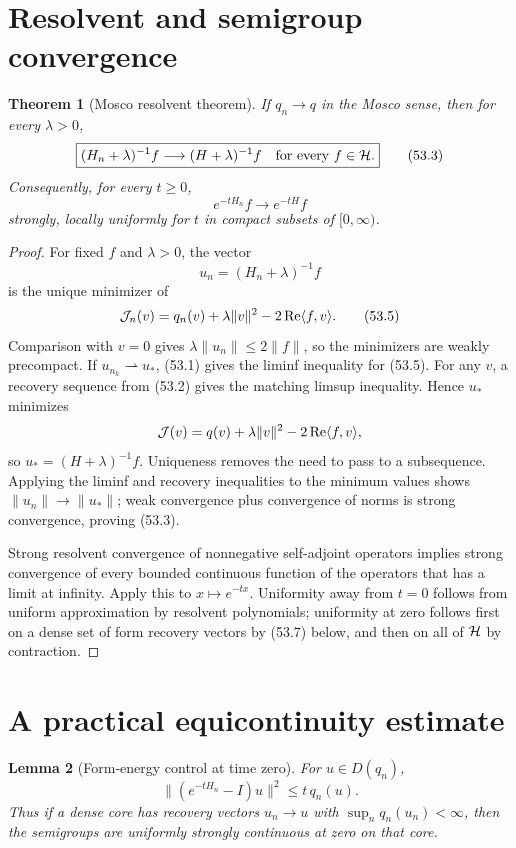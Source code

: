 \documentclass[11pt]{article}
\newtheorem{theorem}{Theorem}[section]
\newtheorem{lemma}[theorem]{Lemma}
\theoremstyle{remark}
\begin{document}
\section{Resolvent and semigroup convergence}

\begin{theorem}[Mosco resolvent theorem]
\label{thm:v15v53-mosco-resolvent}
If \(q_n\to q\) in the Mosco sense, then for every \(\lambda>0\),
\[
 \boxed{
 (H_n+\lambda)^{-1}f\longrightarrow(H+\lambda)^{-1}f
 \quad\text{for every }f\in{\cal H}.}                   \tag{53.3}
\]
Consequently, for every \(t\geq0\),
\[
 e^{-tH_n}f\longrightarrow e^{-tH}f                    \tag{53.4}
\]
strongly, locally uniformly for \(t\) in compact subsets of
\([0,\infty)\).
\end{theorem}

\begin{proof}
For fixed \(f\) and \(\lambda>0\), the vector
\[
 u_n=(H_n+\lambda)^{-1}f
\]
is the unique minimizer of
\[
 {\cal J}_n(v)=q_n(v)+\lambda\|v\|^2
 -2\operatorname{Re}\langle f,v\rangle.                 \tag{53.5}
\]
Comparison with \(v=0\) gives
\(\lambda\|u_n\|\leq2\|f\|\), so the minimizers are weakly
precompact.  If \(u_{n_k}\rightharpoonup u_*\), (53.1) gives the
liminf inequality for (53.5).  For any \(v\), a recovery sequence
from (53.2) gives the matching limsup inequality.  Hence \(u_*\)
minimizes
\[
 {\cal J}(v)=q(v)+\lambda\|v\|^2
-2\operatorname{Re}\langle f,v\rangle,
\]
so \(u_*=(H+\lambda)^{-1}f\).  Uniqueness removes the need to pass
to a subsequence.  Applying the liminf and recovery inequalities to
the minimum values shows
\(\|u_n\|\to\|u_*\|\); weak convergence plus convergence of norms is
strong convergence, proving (53.3).

Strong resolvent convergence of nonnegative self-adjoint operators
implies strong convergence of every bounded continuous function of
the operators that has a limit at infinity.  Apply this to
\(x\mapsto e^{-tx}\).  Uniformity away from \(t=0\) follows from
uniform approximation by resolvent polynomials; uniformity at zero
follows first on a dense set of form recovery vectors by (53.7)
below, and then on all of \({\cal H}\) by contraction.
\end{proof}

\section{A practical equicontinuity estimate}

\begin{lemma}[Form-energy control at time zero]
\label{lem:v15v53-equicontinuity}
For \(u\in D(q_n)\),
\[
 \boxed{
 \|(e^{-tH_n}-I)u\|^2\leq t\,q_n(u).}                   \tag{53.6}
\]
Thus if a dense core has recovery vectors \(u_n\to u\) with
\(\sup_nq_n(u_n)<\infty\), then the semigroups are uniformly
strongly continuous at zero on that core.
\end{lemma}
\end{document}
